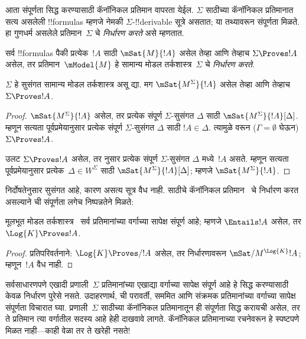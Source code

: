 \documentclass[../../../include/open-logic-section]{subfiles}
\begin{document}


आता संपूर्णता सिद्ध करण्यासाठी कॅनॉनिकल प्रतिमान
वापरता येईल. $\Sigma$ साठीच्या कॅनॉनिकल
प्रतिमानात सत्य असलेली !!{formula}s म्हणजे
नेमकी $\Sigma$-!!{derivable} सूत्रे असतात;
या तथ्यावरून संपूर्णता मिळते. हा गुणधर्म
असलेले प्रतिमान~$\Sigma$ चे
\emph{निर्धारण करते} असे म्हणतात.

\begin{defn}
  सर्व !!{formula}s पैकी प्रत्येक~$!A$ साठी
  $\mSat{M}{!A}$ असेल तेव्हा आणि तेव्हाच
  $\Sigma \Proves !A$ असेल, तर
  प्रतिमान~$\mModel{M}$ हे सामान्य मोडल
  तर्कशास्त्र~$\Sigma$ चे
  \emph{निर्धारण करते}.
\end{defn}

\begin{thm}[निर्धारण]
   $\Sigma$ हे सुसंगत सामान्य मोडल तर्कशास्त्र असू द्या. मग
   $\mSat{M^\Sigma}{!A}$ असेल तेव्हा
   आणि तेव्हाच $\Sigma \Proves !A$.
\end{thm}

\begin{proof}
  $\mSat{M^\Sigma}{!A}$ असेल, तर प्रत्येक
  संपूर्ण $\Sigma$-सुसंगत $\Delta$ साठी
  $\mSat{M^\Sigma}{!A}[\Delta]$.
  म्हणून सत्यता पूर्वप्रमेयानुसार प्रत्येक
  संपूर्ण $\Sigma$-सुसंगत $\Delta$ साठी
  $!A \in \Delta$. त्यामुळे
  वरून ($\Gamma = \emptyset$ घेऊन)
  $\Sigma \Proves !A$.

  उलट $\Sigma \Proves !A$ असेल, तर
  नुसार प्रत्येक संपूर्ण $\Sigma$-सुसंगत
  $\Delta$ मध्ये~$!A$ असते. म्हणून
  सत्यता पूर्वप्रमेयानुसार प्रत्येक~$\Delta \in
  W^\Sigma$ साठी
  $\mSat{M^\Sigma}{!A}[\Delta]$;
  म्हणजे $\mSat{M^\Sigma}{!A}$.
\end{proof}

निर्दोषतेनुसार  सुसंगत आहे, कारण असत्य सूत्र वैध नाही.
 साठीचे कॅनॉनिकल प्रतिमान~
चे निर्धारण करत असल्याने
 ची संपूर्णता लगेच निष्पन्नतेने मिळते:

\begin{cor}
  मूलभूत मोडल तर्कशास्त्र~
सर्व प्रतिमानांच्या वर्गाच्या सापेक्ष
संपूर्ण आहे; म्हणजे
$\Entails !A$ असेल, तर $\Log{K}
\Proves !A$.
\end{cor}

\begin{proof}
  प्रतिपरिवर्तनाने: $\Log{K} \Proves/ !A$
  असेल, तर निर्धारणावरून
  $\mSat/{M^{\Log{K}}}{!A}$;
  म्हणून~$!A$ वैध नाही.
\end{proof}

सर्वसाधारणपणे एखादी प्रणाली~$\Sigma$
प्रतिमानांच्या एखाद्या वर्गाच्या सापेक्ष
संपूर्ण आहे हे सिद्ध करण्यासाठी
केवळ निर्धारण पुरेसे नसते. उदाहरणार्थ,
 ची परावर्ती, सममित आणि
संक्रमक प्रतिमानांच्या वर्गाच्या सापेक्ष
संपूर्णता विचारात घ्या. प्रणाली~$\Sigma$
साठीच्या कॅनॉनिकल प्रतिमानातून ही संपूर्णता सिद्ध करायची असेल,
तर ते प्रतिमान त्या वर्गातील सदस्य आहे हेही दाखवावे लागते.
कॅनॉनिकल प्रतिमानाच्या रचनेवरून हे
स्पष्टपणे मिळत नाही---काही वेळा
तर ते खरेही नसते!
\end{document}
